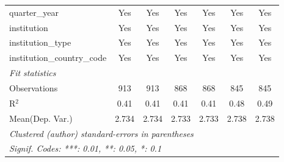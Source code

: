 \begin{tabular}{lcccccc}
   quarter\_year                      & Yes     & Yes     & Yes     & Yes     & Yes     & Yes\\  
   institution                        & Yes     & Yes     & Yes     & Yes     & Yes     & Yes\\  
   institution\_type                  & Yes     & Yes     & Yes     & Yes     & Yes     & Yes\\  
   institution\_country\_code         & Yes     & Yes     & Yes     & Yes     & Yes     & Yes\\  
   \midrule
   \emph{Fit statistics}\\
   Observations                       & 913     & 913     & 868     & 868     & 845     & 845\\  
   R$^2$                              & 0.41    & 0.41    & 0.41    & 0.41    & 0.48    & 0.49\\  
Mean(Dep. Var.) & 2.734 & 2.734 & 2.733 & 2.733 & 2.738 & 2.738 \\
   \midrule \midrule
   \multicolumn{7}{l}{\emph{Clustered (author) standard-errors in parentheses}}\\
   \multicolumn{7}{l}{\emph{Signif. Codes: ***: 0.01, **: 0.05, *: 0.1}}\\
\end{tabular}
\par\endgroup
